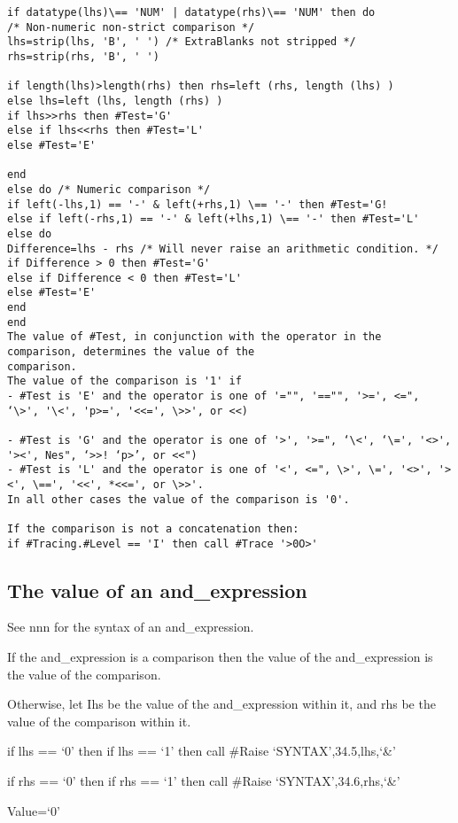\begin{verbatim}
if datatype(lhs)\== 'NUM' | datatype(rhs)\== 'NUM' then do
/* Non-numeric non-strict comparison */
lhs=strip(lhs, 'B', ' ') /* ExtraBlanks not stripped */
rhs=strip(rhs, 'B', ' ')

if length(lhs)>length(rhs) then rhs=left (rhs, length (lhs) )
else lhs=left (lhs, length (rhs) )
if lhs>>rhs then #Test='G'
else if lhs<<rhs then #Test='L'
else #Test='E'

end
else do /* Numeric comparison */
if left(-lhs,1) == '-' & left(+rhs,1) \== '-' then #Test='G!
else if left(-rhs,1) == '-' & left(+lhs,1) \== '-' then #Test='L'
else do
Difference=lhs - rhs /* Will never raise an arithmetic condition. */
if Difference > 0 then #Test='G'
else if Difference < 0 then #Test='L'
else #Test='E'
end
end
The value of #Test, in conjunction with the operator in the comparison, determines the value of the
comparison.
The value of the comparison is '1' if
- #Test is 'E' and the operator is one of '="", '=="", '>=', <=", ‘\>', '\<', 'p>=', '<<=', \>>', or <<)

- #Test is 'G' and the operator is one of '>', '>=", ‘\<', ‘\=', '<>', '><', Nes", ‘>>! ‘p>’, or <<")
- #Test is 'L' and the operator is one of '<', <=", \>', \=', '<>', '><', \==', '<<', *<<=', or \>>'.
In all other cases the value of the comparison is '0'.

If the comparison is not a concatenation then:
if #Tracing.#Level == 'I' then call #Trace '>0O>'
\end{verbatim}

\hypertarget{the-value-of-an-and_expression}{%
\subsection{The value of an
and\_expression}\label{the-value-of-an-and_expression}}

See nnn for the syntax of an and\_expression.

If the and\_expression is a comparison then the value of the
and\_expression is the value of the comparison.

Otherwise, let Ihs be the value of the and\_expression within it, and
rhs be the value of the comparison within it.

if lhs == `0' then if lhs == `1' then call \#Raise
`SYNTAX',34.5,lhs,`\&'

if rhs == `0' then if rhs == `1' then call \#Raise
`SYNTAX',34.6,rhs,`\&'

Value=`0'

